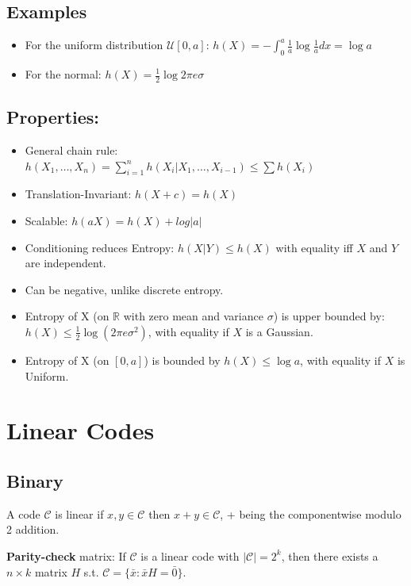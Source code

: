 \documentclass[10pt,a4paper,landscape]{article}
\begin{document}
\begin{multicols*}{4}
\subsection{Examples}
\begin{itemize}
	\item For the uniform distribution $\mathcal{U}[0, a]$:
	$h(X) = - \int_0^a \frac{1}{a} \log \frac{1}{a} dx = \log a$
	\item For the normal:
	$h(X) = \frac{1}{2} \log 2 \pi e \sigma$
\end{itemize}


\subsection{Properties:}
\begin{itemize}
	\item General chain rule: $h(X_1, \ldots, X_n) = \sum_{i=1}^{n} h(X_i|X_1, \ldots, X_{i-1}) \leq \sum h(X_i)$
	\item Translation-Invariant: $h(X + c) = h(X)$
	\item Scalable: $h(aX) = h(X) + log|a|$
	\item Conditioning reduces Entropy: $h(X|Y) \leq h(X)$ with equality iff $X$ and $Y$ are independent.
	\item Can be negative, unlike discrete entropy.
	\item Entropy of X (on $\mathbb{R}$ with zero mean and variance $\sigma$) is upper bounded by: $h(X) \leq \frac{1}{2} \log ( 2\pi e \sigma^2)$, with equality if $X$ is a Gaussian.
	\item Entropy of X (on $[0, a]$) is bounded by $h(X) \leq \log a$, with equality if $X$ is Uniform.
\end{itemize}

\section{Linear Codes}
\subsection{Binary}
A code $\mathcal{C}$ is linear if $x,y \in \mathcal{C}$ then $x+y \in \mathcal{C}$, + being the componentwise modulo 2 addition.

\textbf{Parity-check} matrix: If $\mathcal{C}$ is a linear code with $|\mathcal{C}| = 2^k$, then there exists a $n \times k$ matrix $H$ s.t. $\mathcal{C} = \{\bar{x}: \bar{x}H = \bar{0}\}$.


\end{multicols*}
\end{document}
